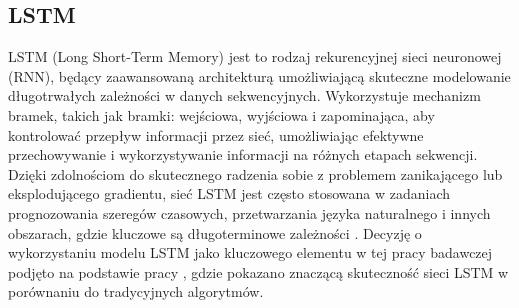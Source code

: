 \documentclass[polish, twoside, 12pt, a4paper]{article}
\theoremstyle{definition}
\theoremstyle{plain}
\theoremstyle{remark}
\begin{document}
\subsection{LSTM}

LSTM (Long Short-Term Memory) jest to rodzaj rekurencyjnej sieci neuronowej (RNN), będący zaawansowaną architekturą umożliwiającą skuteczne modelowanie długotrwałych zależności w danych sekwencyjnych. Wykorzystuje mechanizm bramek, takich jak bramki: wejściowa, wyjściowa i zapominająca, aby kontrolować przepływ informacji przez sieć, umożliwiając efektywne przechowywanie i wykorzystywanie informacji na różnych etapach sekwencji. Dzięki zdolnościom do skutecznego radzenia sobie z problemem zanikającego lub eksplodującego gradientu, sieć LSTM jest często stosowana w zadaniach prognozowania szeregów czasowych, przetwarzania języka naturalnego i innych obszarach, gdzie kluczowe są długoterminowe zależności \parencite{geron2020}.  Decyzję o wykorzystaniu modelu LSTM jako kluczowego elementu w tej pracy badawczej podjęto na podstawie pracy \parencite{siami-namini2018}, gdzie pokazano znaczącą skuteczność sieci LSTM w porównaniu do tradycyjnych algorytmów.
\end{document}
